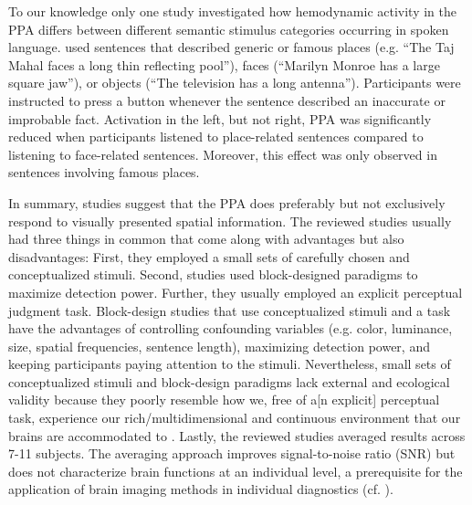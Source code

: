 \documentclass[english]{article}
\begin{document}
To our knowledge only one study \citep{aziz2008modulation} investigated how
hemodynamic activity in the PPA differs between different semantic stimulus
categories occurring in spoken language.
\cite{aziz2008modulation} used sentences that described generic or famous places
(e.g. ``The Taj Mahal faces a long thin reflecting pool''), faces (``Marilyn
Monroe has a large square jaw''), or objects (``The television has a long
antenna'').
Participants were instructed to press a button whenever the sentence described
an inaccurate or improbable fact.
Activation in the left, but not right, PPA was significantly reduced when
participants listened to place-related sentences compared to listening to
face-related sentences. Moreover, this effect was only observed in sentences
involving famous places.

In summary, studies suggest that the PPA does preferably but not exclusively
respond to visually presented spatial information.
The reviewed studies usually had three things in common that come along with
advantages but also disadvantages:
First, they employed a small sets of carefully chosen and conceptualized
stimuli.
Second, studies used block-designed paradigms to maximize detection power.
Further, they usually employed an explicit perceptual judgment task.
Block-design studies that use conceptualized stimuli and a task have the
advantages of controlling confounding variables (e.g. color, luminance, size,
spatial frequencies, sentence length), maximizing detection power, and keeping
participants paying attention to the stimuli.
Nevertheless, small sets of conceptualized stimuli and block-design paradigms
lack external and ecological validity \citep{westfall2016fixing,
hasson2004intersubject} because they poorly resemble how we, free of a[n
explicit] perceptual task, experience our rich/multidimensional and continuous
environment that our brains are accommodated to
\citep{sonkusare2019naturalistic}.
Lastly, the reviewed studies averaged results across 7-11 subjects.
The averaging approach improves signal-to-noise ratio (SNR) but does not
characterize brain functions at an individual level, a prerequisite for the
application of brain imaging methods in individual diagnostics (cf.
\cite{dubois2016building, eickhoff2020towards}).
\end{document}

